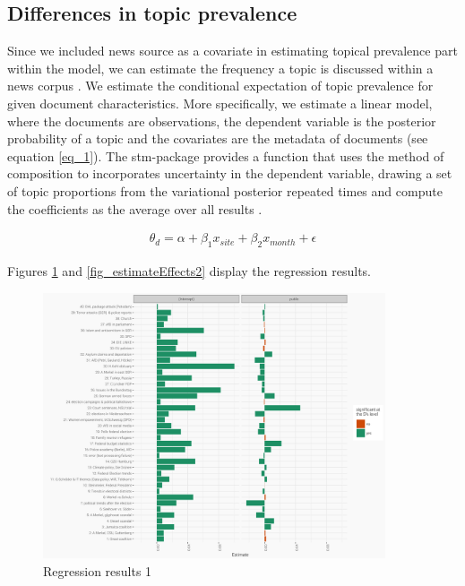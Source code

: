 \documentclass[12pt,a4paper,notitlepage]{article}
\begin{document}
\subsection{Differences in topic prevalence}
Since we included news source as a covariate in estimating topical prevalence part within the model, we can estimate the frequency a topic is discussed within a news corpus \citep{roberts_model_2016}. We estimate the conditional expectation of topic prevalence for given document characteristics. More specifically, we estimate a linear model, where the documents are observations, the dependent variable is the posterior probability of a topic and the covariates are the metadata of documents (see equation \ref{eq_1}). The stm-package provides a function that uses the method of composition to incorporates uncertainty in the dependent variable, drawing a set of topic proportions from the variational posterior repeated times and compute the coefficients as the average over all results \citep{roberts_stm:_2016}. 

\begin{align}\label{eq_1}
	\theta_d=\alpha+\beta_1x_{site}+\beta_2x_{month}+\epsilon
\end{align}

Figures \ref{fig_estimateEffects1} and \ref{fig_estimateEffects2} display the regression results.  

\begin{figure}[H]
	\caption{Regression results 1}
		\begin{center}
			\includegraphics[width=0.9\textwidth,keepaspectratio]{../figs/estimates_site.png}
		\end{center}
	\label{fig_estimateEffects1}
\end{figure}
\end{document}
